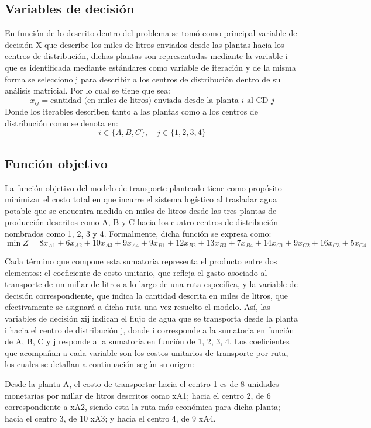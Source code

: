 \documentclass{article}
\begin{document}
	\subsection{Variables de decisión}
	En función de lo descrito dentro del problema se tomó como principal variable de decisión X que describe los miles de litros enviados desde las plantas hacia los centros de distribución, dichas plantas son representadas mediante la variable i que es identificada mediante estándares como variable de iteración y de la misma forma se selecciono j para describir a los centros de distribución dentro de su análisis matricial. Por lo cual se tiene que sea:
	\[
	x_{ij} = \text{cantidad (en miles de litros) enviada desde la planta } i \text{ al CD } j
	\]
	Donde los iterables describen tanto a las plantas como a los centros de distribución como se denota en:
	\[
	i \in \{A, B, C\}, \quad j \in \{1,2,3,4\}
	\]
	
	\subsection{Función objetivo}
	
	La función objetivo del modelo de transporte planteado tiene como propósito minimizar el costo total en que incurre el sistema logístico al trasladar agua potable que se encuentra medida en miles de litros desde las tres plantas de producción descritos como A, B y C hacia los cuatro centros de distribución nombrados como 1, 2, 3 y 4. Formalmente, dicha función se expresa como:
	\[
	\min Z =
	8x_{A1} + 6x_{A2} + 10x_{A3} + 9x_{A4}
	+ 9x_{B1} + 12x_{B2} + 13x_{B3} + 7x_{B4}
	+ 14x_{C1} + 9x_{C2} + 16x_{C3} + 5x_{C4}
	\]
	
	Cada término que compone esta sumatoria representa el producto entre dos elementos: el coeficiente de costo unitario, que refleja el gasto asociado al transporte de un millar de litros a lo largo de una ruta específica, y la variable de decisión correspondiente, que indica la cantidad descrita en miles de litros, que efectivamente se asignará a dicha ruta una vez resuelto el modelo.
	Así, las variables de decisión xij indican el flujo de agua que se transporta desde la planta i hacia el centro de distribución j, donde i corresponde a la sumatoria en función de {A, B, C} y j responde a la sumatoria en función de  {1, 2, 3, 4}. Los coeficientes que acompañan a cada variable son los costos unitarios de transporte por ruta, los cuales se detallan a continuación según su origen:
	
	Desde la planta A, el costo de transportar hacia el centro 1 es de 8 unidades monetarias por millar de litros descritos como xA1; hacia el centro 2, de 6 correspondiente a xA2, siendo esta la ruta más económica para dicha planta; hacia el centro 3, de 10 xA3; y hacia el centro 4, de 9 xA4.
	
\end{document}

